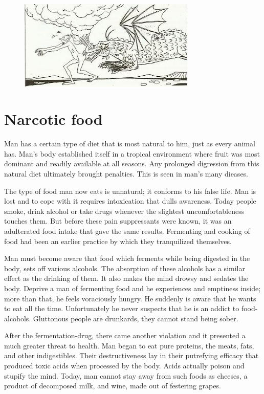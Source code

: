 \documentclass[12pt,letterpaper]{article}
\begin{document}
\begin{figure}
    \centering
    \includegraphics[width=0.75\textwidth]{p12.jpg}
\end{figure}


\section{Narcotic food}

Man has a certain type of diet that is most natural to him, just as
every animal has. Man's body established itself in a tropical
environment where fruit was most dominant and readily available at all
seasons. Any prolonged digression from this natural diet ultimately
brought penalties. This is seen in man's many dieases.

The type of food man now eats is unnatural; it conforms to his false
life. Man is lost and to cope with it requires intoxication that dulls
awareness. Today people smoke, drink alcohol or take drugs whenever
the slightest uncomfortableness touches them. But before these pain
suppressants were known, it was an adulterated food intake that gave
the same results. Fermenting and cooking of food had been an earlier
practice by which they tranquilized themselves.

Man must become aware that food which ferments while being digested in
the body, sets off various alcohols. The absorption of these alcohols
has a similar effect as the drinking of them. It also makes the mind
drowsy and sedates the body. Deprive a man of fermenting food and he
experiences and emptiness inside; more than that, he feels voraciously
hungry. He suddenly is aware that he wants to eat all the
time. Unfortunately he never suspects that he is an addict to
food-alcohols. Gluttonous people are drunkards, they cannot stand
being sober.

After the fermentation-drug, there came another violation and it
presented a much greater threat to health. Man began to eat pure
proteins, the meats, fats, and other indigestibles. Their
destructiveness lay in their putrefying efficacy that produced toxic
acids when processed by the body. Acids actually poison and stupify
the mind. Today, man cannot stay away from such foods as cheeses, a
product of decomposed milk, and wine, made out of festering grapes.
\end{document}
